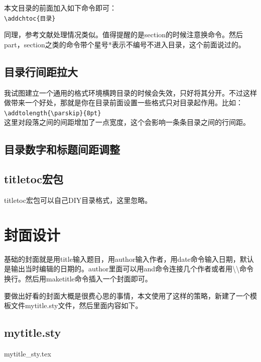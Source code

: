 \documentclass[11pt,oneside]{book}
\begin{document}
\begin{common-format}
本文目录的前面加入如下命令即可：\\
\verb+\addchtoc{目录}+

同理，参考文献处理情况类似。值得提醒的是section的时候注意换命令。然后part，section之类的命令带个星号*表示不编号不进入目录，这个前面说过的。

\subsection{目录行间距拉大}
我试图建立一个通用的格式环境横跨目录的时候会失效，只好将其分开。不过这样做带来一个好处，那就是你在目录前面设置一些格式只对目录起作用。比如：\\
\verb+\addtolength{\parskip}{8pt}+\\
这里对段落之间的间距增加了一点宽度，这个会影响一条条目录之间的行间距。


\subsection{目录数字和标题间距调整}


\subsection{titletoc宏包}
titletoc宏包可以自己DIY目录格式，这里忽略。


\section{封面设计}
基础的封面就是用title输入题目，用author输入作者，用date命令输入日期，默认是输出当时编辑的日期的。author里面可以用and命令连接几个作者或者用\textbackslash \textbackslash 命令换行。然后用maketitle命令插入一个封面即可。

要做出好看的封面大概是很费心思的事情，本文使用了这样的策略，新建了一个模板文件mytitle.sty文件，然后里面内容如下。
\subsection{mytitle.sty}
\begin{xverbatim}{mytitle_sty.tex}


\def\titlea#1{\gdef\@titlea{#1}}
\def\@titlea{\@latex@warning@no@line{No \noexpand\titlea given}}
\def\titleb#1{\gdef\@titleb{#1}}
\def\@titleb{\@latex@warning@no@line{No \noexpand\titleb given}}
\def\titlec#1{\gdef\@titlec{#1}}
\def\@titlec{\@latex@warning@no@line{No \noexpand\titlec given}}


\end{xverbatim}
\end{common-format}
\end{document}

